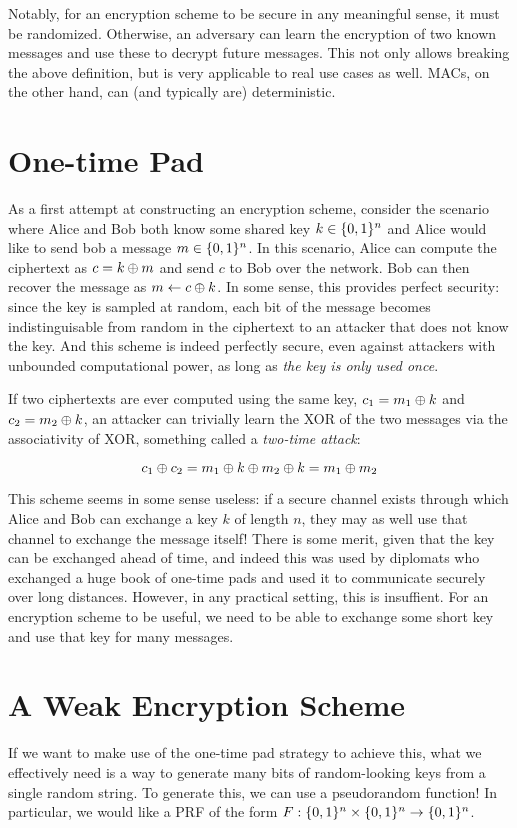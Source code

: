 Notably, for an encryption scheme to be secure in any meaningful sense, it must be randomized. Otherwise, an adversary can learn the encryption of two known messages and use these to decrypt future messages. This not only allows breaking the above definition, but is very applicable to real use cases as well. MACs, on the other hand, can (and typically are) deterministic.

\section{One-time Pad}
As a first attempt at constructing an encryption scheme, consider the scenario where Alice and Bob both know some shared key $k \in \{0,1\}^n$ and Alice would like to send bob a message $m \in \{0,1\}^n$. In this scenario, Alice can compute the ciphertext as $c = k \oplus m$ and send $c$ to Bob over the network. Bob can then recover the message as $m \leftarrow c \oplus k$. In some sense, this provides perfect security: since the key is sampled at random, each bit of the message becomes indistinguisable from random in the ciphertext to an attacker that does not know the key. And this scheme is indeed perfectly secure, even against attackers with unbounded computational power, as long as \emph{the key is only used once}.

If two ciphertexts are ever computed using the same key, $c_1 = m_1 \oplus k$ and $c_2 = m_2 \oplus k$, an attacker can trivially learn the XOR of the two messages via the associativity of XOR, something called a \emph{two-time attack}:

\[ c_1 \oplus c_2 = m_1 \oplus k \oplus m_2 \oplus k = m_1 \oplus m_2 \]

This scheme seems in some sense useless: if a secure channel exists through which Alice and Bob can exchange a key $k$ of length $n$, they may as well use that channel to exchange the message itself! There is some merit, given that the key can be exchanged ahead of time, and indeed this was used by diplomats who exchanged a huge book of one-time pads and used it to communicate securely over long distances. However, in any practical setting, this is insuffient. For an encryption scheme to be useful, we need to be able to exchange some short key and use that key for many messages.

\section{A Weak Encryption Scheme}
If we want to make use of the one-time pad strategy to achieve this, what we effectively need is a way to generate many bits of random-looking keys from a single random string. To generate this, we can use a pseudorandom function! In particular, we would like a PRF of the form $F: \{0,1\}^n \times \{0,1\}^n \rightarrow \{0,1\}^n$. 


